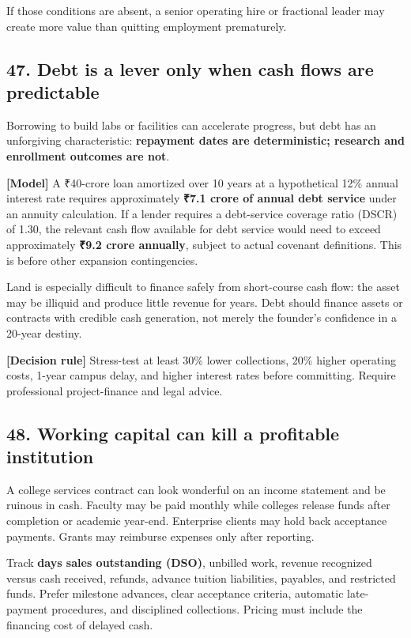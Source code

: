 If those conditions are absent, a senior operating hire or fractional leader may create more value than quitting employment prematurely.

\subsection{47. Debt is a lever only when cash flows are predictable}

Borrowing to build labs or facilities can accelerate progress, but debt has an unforgiving characteristic: \textbf{repayment dates are deterministic; research and enrollment outcomes are not}.

\textbf{\textbf{[Model]}} A \textnormal{₹}40-crore loan amortized over 10 years at a hypothetical 12\% annual interest rate requires approximately \textbf{\textnormal{₹}7.1 crore of annual debt service} under an annuity calculation. If a lender requires a debt-service coverage ratio (DSCR) of 1.30, the relevant cash flow available for debt service would need to exceed approximately \textbf{\textnormal{₹}9.2 crore annually}, subject to actual covenant definitions. This is before other expansion contingencies.

Land is especially difficult to finance safely from short-course cash flow: the asset may be illiquid and produce little revenue for years. Debt should finance assets or contracts with credible cash generation, not merely the founder's confidence in a 20-year destiny.

\textbf{\textbf{[Decision rule]}} Stress-test at least 30\% lower collections, 20\% higher operating costs, 1-year campus delay, and higher interest rates before committing. Require professional project-finance and legal advice.

\subsection{48. Working capital can kill a profitable institution}

A college services contract can look wonderful on an income statement and be ruinous in cash. Faculty may be paid monthly while colleges release funds after completion or academic year-end. Enterprise clients may hold back acceptance payments. Grants may reimburse expenses only after reporting.

Track \textbf{days sales outstanding (DSO)}, unbilled work, revenue recognized versus cash received, refunds, advance tuition liabilities, payables, and restricted funds. Prefer milestone advances, clear acceptance criteria, automatic late-payment procedures, and disciplined collections. Pricing must include the financing cost of delayed cash.

